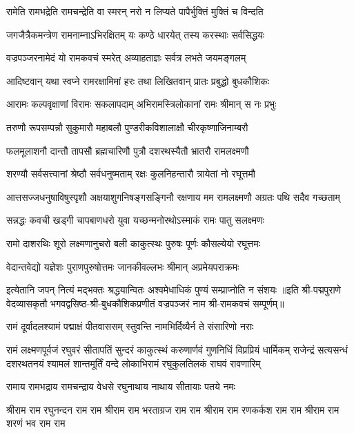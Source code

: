 \twolineshloka
{रामेति रामभद्रेति रामचन्द्रेति वा स्मरन्}
{नरो न लिप्यते पापैर्भुक्तिं मुक्तिं च विन्दति}

\twolineshloka
{जगजैत्रैकमन्त्रेण रामनाम्नाऽभिरक्षितम्}
{यः कण्ठे धारयेत् तस्य करस्थाः सर्वसिद्धयः}

\twolineshloka
{वज्रपञ्जरनामेदं यो रामकवचं स्मरेत्}
{अव्याहताज्ञः सर्वत्र लभते जयमङ्गलम्}

\twolineshloka
{आदिष्टवान् यथा स्वप्ने रामरक्षामिमां हरः}
{तथा लिखितवान् प्रातः प्रबुद्धो बुधकौशिकः}

\twolineshloka
{आरामः कल्पवृक्षाणां विरामः सकलापदाम्}
{अभिरामस्त्रिलोकानां रामः श्रीमान् स नः प्रभुः}

\twolineshloka
{तरुणौ रूपसम्पन्नौ सुकुमारौ महाबलौ}
{पुण्डरीकविशालाक्षौ चीरकृष्णाजिनाम्बरौ}

\twolineshloka
{फलमूलाशनौ दान्तौ तापसौ ब्रह्मचारिणौ}
{पुत्रौ दशरथस्यैतौ भ्रातरौ रामलक्ष्मणौ}

\twolineshloka
{शरण्यौ सर्वसत्त्वानां श्रेष्ठौ सर्वधनुष्मताम्}
{रक्षः कुलनिहन्तारौ त्रायेतां नो रघूत्तमौ}

\fourlineindentedshloka
{आत्तसज्जधनुषाविषुस्पृशौ}
{अक्षयाशुगनिषङ्गसङ्गिनौ}
{रक्षणाय मम रामलक्ष्मणौ}
{अग्रतः पथि सदैव गच्छताम्}

\twolineshloka
{सन्नद्धः कवची खड्गी चापबाणधरो युवा}
{यच्छन्मनोरथोऽस्माकं रामः पातु सलक्ष्मणः}

\twolineshloka
{रामो दाशरथिः शूरो लक्ष्मणानुचरो बली}
{काकुत्स्थः पुरुषः पूर्णः कौसल्येयो रघूत्तमः}

\twolineshloka
{वेदान्तवेद्यो यज्ञेशः पुराणपुरुषोत्तमः}
{जानकीवल्लभः श्रीमान् अप्रमेयपराक्रमः}

\twolineshloka
{इत्येतानि जपन् नित्यं मद्भक्तः श्रद्धयान्वितः}
{अश्वमेधाधिकं पुण्यं सम्प्राप्नोति न संशयः}
॥इति श्री-पद्मपुराणे वेदव्यासकृतौ भगवद्वसिष्ठ-श्री-बुधकौशिकप्रणीतं वज्रपञ्जरं नाम श्री-रामकवचं सम्पूर्णम्॥

\resetShloka
\twolineshloka
{रामं दूर्वादलश्यामं पद्माक्षं पीतवाससम्}
{स्तुवन्ति नामभिर्दिव्यैर्न ते संसारिणो नराः}

\fourlineindentedshloka
{रामं लक्ष्मणपूर्वजं रघुवरं सीतापतिं सुन्दरं}
{काकुत्स्थं करुणार्णवं गुणनिधिं विप्रप्रियं धार्मिकम्}
{राजेन्द्रं सत्यसन्धं दशरथतनयं श्यामलं शान्तमूर्तिं}
{वन्दे लोकाभिरामं रघुकुलतिलकं राघवं रावणारिम्}

\twolineshloka
{रामाय रामभद्राय रामचन्द्राय वेधसे}
{रघुनाथाय नाथाय सीतायाः पतये नमः}

\fourlineindentedshloka
{श्रीराम राम रघुनन्दन राम राम}
{श्रीराम राम भरताग्रज राम राम}
{श्रीराम राम रणकर्कश राम राम}
{श्रीराम राम शरणं भव राम राम}

